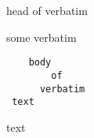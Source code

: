 \begin{myenv}
	head of verbatim
\end{myenv}
some verbatim
\begin{verbatim}
    body
        of
      verbatim
 text
\end{verbatim}
text
